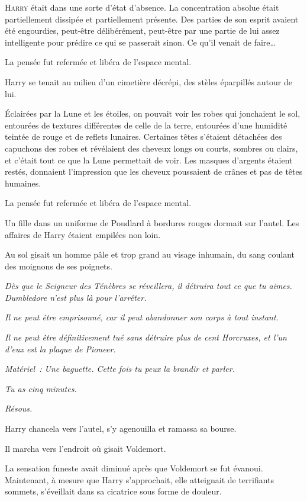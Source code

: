 
\lettrine{H}{arry} était dans une sorte d'état d'absence. La concentration absolue était partiellement dissipée et partiellement présente. Des parties de son esprit avaient été engourdies, peut-être délibérément, peut-être par une partie de lui assez intelligente pour prédire ce qui se passerait sinon. Ce qu'il venait de faire…

La pensée fut refermée et libéra de l'espace mental.

Harry se tenait au milieu d'un cimetière décrépi, des stèles éparpillés autour de lui.

Éclairées par la Lune et les étoiles, on pouvait voir les robes qui jonchaient le sol, entourées de textures différentes de celle de la terre, entourées d'une humidité teintée de rouge et de reflets lunaires. Certaines têtes s'étaient détachées des capuchons des robes et révélaient des cheveux longs ou courts, sombres ou clairs, et c'était tout ce que la Lune permettait de voir. Les masques d'argents étaient restés, donnaient l'impression que les cheveux poussaient de crânes et pas de têtes humaines.

La pensée fut refermée et libéra de l'espace mental.

Un fille dans un uniforme de Poudlard à bordures rouges dormait sur l'autel. Les affaires de Harry étaient empilées non loin.

Au sol gisait un homme pâle et trop grand au visage inhumain, du sang coulant des moignons de ses poignets.

\emph{Dès que le Seigneur des Ténèbres se réveillera, il détruira tout ce que tu aimes. Dumbledore n'est plus là pour l'arrêter.}

\emph{Il ne peut être emprisonné, car il peut abandonner son corps à tout instant.}

\emph{Il ne peut être définitivement tué sans détruire plus de cent Horcruxes, et l'un d'eux est la plaque de Pioneer.}

\emph{Matériel~: Une baguette. Cette fois tu peux la brandir et parler.}

\emph{Tu as cinq minutes.}

\emph{Résous.}

Harry chancela vers l'autel, s'y agenouilla et ramassa sa bourse.

Il marcha vers l'endroit où gisait Voldemort.

La sensation funeste avait diminué après que Voldemort se fut évanoui. Maintenant, à mesure que Harry s'approchait, elle atteignait de terrifiants sommets, s'éveillait dans sa cicatrice sous forme de douleur.

